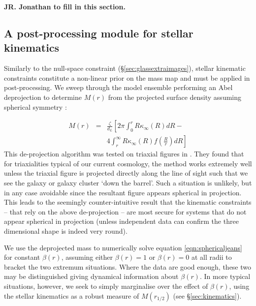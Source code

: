 \documentclass[galley,usenatbib]{mn2e}
\begin{document}
{\bf JR. Jonathan to fill in this section.} 

\subsection{A post-processing module for stellar kinematics}\label{sec:glasskinematics} 
Similarly to the null-space constraint (\S\ref{sec:glassextraimages}), stellar
kinematic constraints constitute a non-linear prior on the mass map and must be
applied in post-processing. We sweep through the model ensemble performing an
Abel deprojection to determine $M(r)$ from the projected surface density
assuming spherical symmetry
\citep[e.g.][]{2008gady.book.....B,2008MNRAS.390.1647B}: 

\begin{eqnarray} 
M(r) & = & \frac{\zeta}{d_L} \left[2\pi\int_0^r R\kappa_\infty(R)dR - \right. \nonumber \\
& & \left. 4\int_r^\infty R\kappa_\infty(R)f\left(\frac{R}{r}\right)dR\right]
\end{eqnarray} 
This de-projection algorithm was tested on triaxial figures in \citet{2006ApJ...652L...5S}. They found that for triaxialities typical of our current cosmology, the method works extremely well unless the triaxial figure is projected directly along the line of sight such that we see the galaxy or galaxy cluster `down the barrel'. Such a situation is unlikely, but in any case avoidable since the resultant figure appears spherical in projection. This leads to the seemingly counter-intuitive result that the kinematic constraints -- that rely on the above de-projection -- are most secure for systems that do not appear spherical in projection (unless independent data can confirm the three dimensional shape is indeed very round). 

We use the deprojected mass to numerically solve equation \ref{eqn:sphericaljeans} for constant $\beta(r)$, assuming either $\beta(r) = 1$ or $\beta(r) = 0$ at all radii to bracket the two extremum situations. Where the data are good enough, these two may be distinguished giving dynamical information about $\beta(r)$. In more typical situations, however, we seek to simply marginalise over the effect of $\beta(r)$, using the stellar kinematics as a robust measure of $M(r_{1/2})$ (see \S\ref{sec:kinematics}). 

\end{document}
